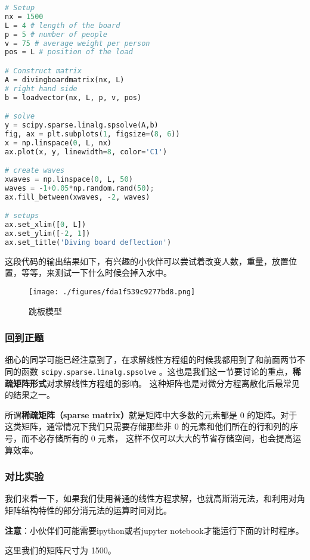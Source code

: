 \begin{lstlisting}[language=python]
# Setup
nx = 1500
L = 4 # length of the board
p = 5 # number of people
v = 75 # average weight per person
pos = L # position of the load

# Construct matrix
A = divingboardmatrix(nx, L)
# right hand side
b = loadvector(nx, L, p, v, pos)

# solve
y = scipy.sparse.linalg.spsolve(A,b)
fig, ax = plt.subplots(1, figsize=(8, 6))
x = np.linspace(0, L, nx)
ax.plot(x, y, linewidth=8, color='C1')

# create waves
xwaves = np.linspace(0, L, 50)
waves = -1+0.05*np.random.rand(50);  
ax.fill_between(xwaves, -2, waves)

# setups
ax.set_xlim([0, L])
ax.set_ylim([-2, 1])
ax.set_title('Diving board deflection')
\end{lstlisting}
这段代码的输出结果如下，有兴趣的小伙伴可以尝试着改变人数，重量，放置位置，等等，来测试一下什么时候会掉入水中。

\begin{figure}[ht]
\centering
\texttt{[image: ./figures/fda1f539c9277bd8.png]}
\caption{跳板模型} \label{fig_NLinE3_2}
\end{figure}

\subsubsection{回到正题}

细心的同学可能已经注意到了，在求解线性方程组的时候我都用到了和前面两节不同的函数 \verb`scipy.sparse.linalg.spsolve` 。这也是我们这一节要讨论的重点，\textbf{稀疏矩阵形式}对求解线性方程组的影响。 这种矩阵也是对微分方程离散化后最常见的结果之一。

所谓\textbf{稀疏矩阵（sparse matrix）}就是矩阵中大多数的元素都是 0 的矩阵。对于这类矩阵，通常情况下我们只需要存储那些非 0 的元素和他们所在的行和列的序号，而不必存储所有的 0 元素， 这样不仅可以大大的节省存储空间，也会提高运算效率。

\subsubsection{对比实验}

我们来看一下，如果我们使用普通的线性方程求解，也就高斯消元法，和利用对角矩阵结构特性的部分消元法的运算时间对比。

\textbf{注意}：小伙伴们可能需要ipython或者jupyter notebook才能运行下面的计时程序。

这里我们的矩阵尺寸为 1500。

